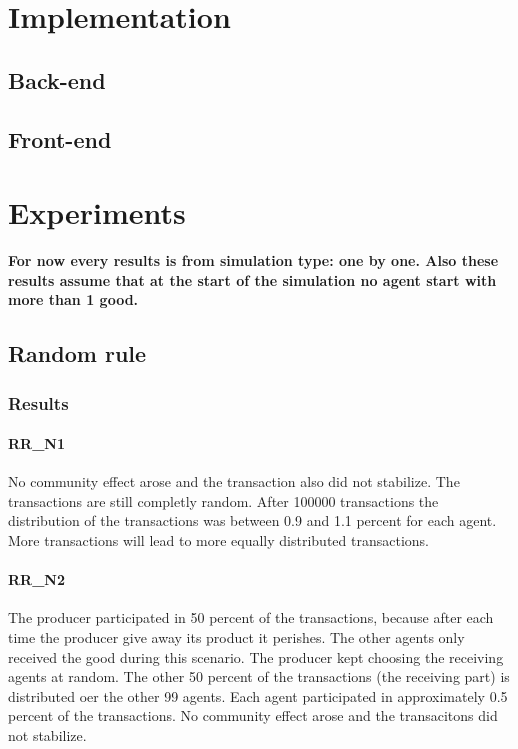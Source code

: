 \documentclass[twoside,openright]{uva-bachelor-thesis}
\begin{document}
\chapter{Implementation}

\section{Back-end}

\section{Front-end}

\chapter{Experiments}
\textbf{For now every results is from simulation type: one by one. Also these results assume that at the start of the simulation no agent start with more than 1 good.}
\section{Random rule}

\subsection{Results}

\subsubsection{RR\_N1}
No community effect arose and the transaction also did not stabilize. The transactions are still completly random. After 100000 transactions the distribution of the transactions was between 0.9 and 1.1 percent for each agent. More transactions will lead to more equally distributed transactions.

\subsubsection{RR\_N2}
The producer participated in 50 percent of the transactions, because after each time the producer give away its product it perishes. The other agents only received the good during this scenario. The producer kept choosing the receiving agents at random. The other 50 percent of the transactions (the receiving part) is distributed oer the other 99 agents. Each agent participated in approximately 0.5 percent of the transactions. No community effect arose and the transacitons did not stabilize.
\end{document}

